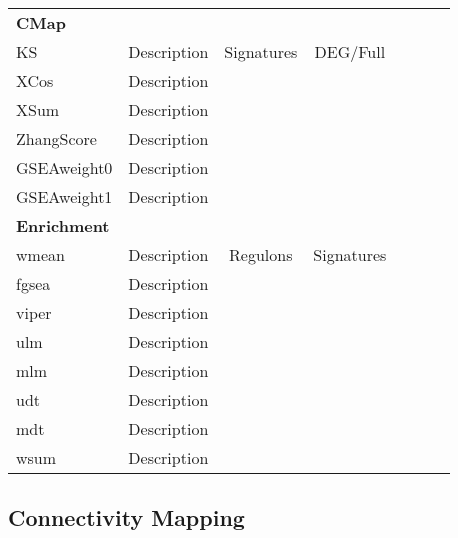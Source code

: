 \begin{xltabular}{\textwidth}{Xcccccc}
\midrule
\textbf{CMap} \\
KS             & Description & Signatures   & DEG/Full     & ~\cite{cmap} \\
XCos           & Description &              &              & ~\cite{cmap} \\
XSum           & Description &              &              & ~\cite{cmap} \\
ZhangScore     & Description &              &              & ~\cite{cmap} \\
GSEAweight0    & Description &              &              & ~\cite{cmap} \\
GSEAweight1    & Description &              &              & ~\cite{cmap} \\
\midrule
\textbf{Enrichment} \\
wmean   & Description  & Regulons     & Signatures  & ~\cite{cbdd} \\
fgsea   & Description  &              &             & ~\cite{fgsea} \\
viper   & Description  &              &             & ~\cite{viper} \\
ulm     & Description  &              &             & ~\cite{cbdd} \\
mlm     & Description  &              &             & ~\cite{cbdd} \\
udt     & Description  &              &             & ~\cite{cbdd} \\
mdt     & Description  &              &             & ~\cite{cbdd} \\
wsum    & Description  &              &             & ~\cite{fgsea} \\
\bottomrule
\end{xltabular}
\egroup



\subsection{Connectivity Mapping} %
\label{sub:connectivity_mapping}

